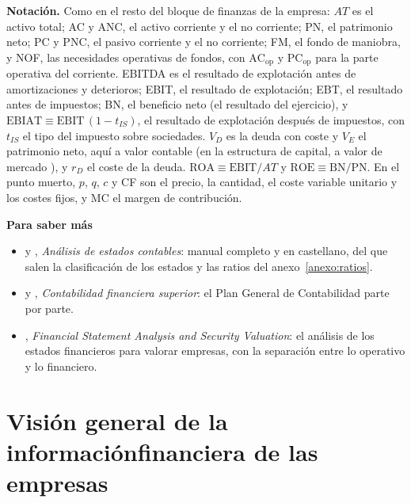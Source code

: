 \documentclass[11pt]{article}
\begin{document}
\begin{anotaciones}
\textbf{Notación.} Como en el resto del bloque de finanzas de la empresa: $AT$ es el activo total; AC y ANC, el activo corriente y el no corriente; PN, el patrimonio neto; PC y PNC, el pasivo corriente y el no corriente; FM, el fondo de maniobra, y NOF, las necesidades operativas de fondos, con $\mathrm{AC}_{\mathrm{op}}$ y $\mathrm{PC}_{\mathrm{op}}$ para la parte operativa del corriente. EBITDA es el resultado de explotación antes de amortizaciones y deterioros; EBIT, el resultado de explotación; EBT, el resultado antes de impuestos; BN, el beneficio neto (el resultado del ejercicio), y $\mathrm{EBIAT}\equiv\mathrm{EBIT}\,(1-t_{IS})$, el resultado de explotación después de impuestos, con $t_{IS}$ el tipo del impuesto sobre sociedades. $V_D$ es la deuda con coste y $V_E$ el patrimonio neto, aquí a valor contable (en la estructura de capital, a valor de mercado ), y $r_D$ el coste de la deuda. $\mathrm{ROA}\equiv\mathrm{EBIT}/AT$ y $\mathrm{ROE}\equiv\mathrm{BN}/\mathrm{PN}$. En el punto muerto, $p$, $q$, $c$ y CF son el precio, la cantidad, el coste variable unitario y los costes fijos, y MC el margen de contribución.
\end{anotaciones}

\begin{anotaciones}
\textbf{Para saber más}
\begin{itemize}
\item {} y , \emph{Análisis de estados contables}: manual completo y en castellano, del que salen la clasificación de los estados y las ratios del anexo~\ref{anexo:ratios}\nocite{GarridoIniguez2017Analisis}.
\item {} y , \emph{Contabilidad financiera superior}: el Plan General de Contabilidad parte por parte\nocite{BesteiroMazarracin2016Contabilidad}.
\item {}, \emph{Financial Statement Analysis and Security Valuation}: el análisis de los estados financieros para valorar empresas, con la separación entre lo operativo y lo financiero\nocite{Penman2013Financial}.
\end{itemize}
\end{anotaciones}

\section{Visión general de la información\cortetitulo financiera de las empresas}\label{sec:vision-general}
\end{document}
